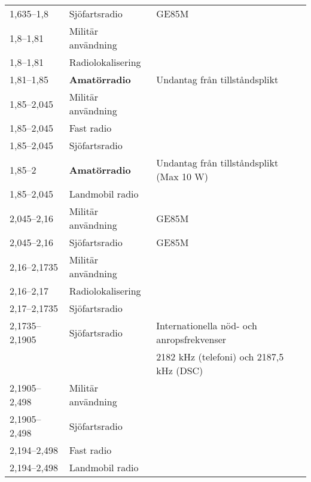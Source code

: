 \begin{landscape}
\begin{longtable}{lll}
1,635--1,8	 & Sjöfartsradio                   & GE85M                                     \\
1,8--1,81	 & Militär användning              &                                           \\ 
1,8--1,81	 & Radiolokalisering               &                                           \\
1,81--1,85	 & \textbf{Amatörradio}                     & Undantag från tillståndsplikt             \\
1,85--2,045	 & Militär användning              &                                           \\
1,85--2,045	 & Fast radio                      &                                           \\
1,85--2,045	 & Sjöfartsradio                   &                                           \\
1,85--2	 	 & \textbf{Amatörradio}                     & Undantag från tillståndsplikt (Max 10 W)  \\
1,85--2,045	 & Landmobil radio                 &                                           \\
2,045--2,16	 & Militär användning              & GE85M                                     \\
2,045--2,16	 & Sjöfartsradio                   & GE85M                                     \\
2,16--2,1735	 & Militär användning              &                                           \\	 
2,16--2,17	 & Radiolokalisering               &                                           \\	 
2,17--2,1735	 & Sjöfartsradio                   &                                           \\
2,1735--2,1905	 & Sjöfartsradio                   & Internationella nöd- och anropsfrekvenser \\
                 &                                 & 2182 kHz (telefoni) och 2187,5 kHz (DSC)  \\
2,1905--2,498	 & Militär användning              &                                           \\	 
2,1905--2,498	 & Sjöfartsradio                   &                                           \\
2,194--2,498	 & Fast radio                      &                                           \\
2,194--2,498	 & Landmobil radio                 &                                           \\	 

\end{longtable}
\end{landscape}
